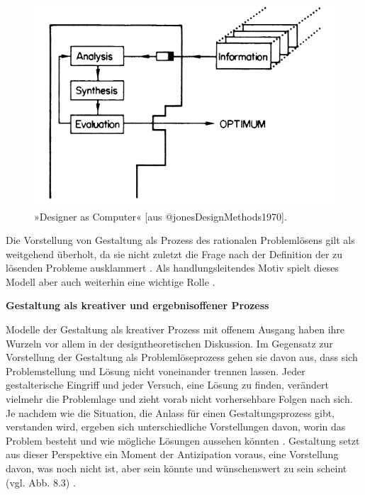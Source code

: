 \documentclass[
  a4paper,
]{book}
\begin{document}
\begin{figure}

{\centering \includegraphics[width=0.75\linewidth]{Figures/08-02-Designer-als-Computer} 

}

\caption{»Designer as Computer« [aus @jonesDesignMethods1970].}\label{fig:fig9}
\end{figure}

Die Vorstellung von Gestaltung als Prozess des rationalen Problemlösens gilt als weitgehend überholt, da sie nicht zuletzt die Frage nach der Definition der zu lösenden Probleme ausklammert \citep[z.B.][]{rittelPlanningCrisisSystems1972}. Als handlungsleitendes Motiv spielt dieses Modell aber auch weiterhin eine wichtige Rolle \citep{pahlKonstruktionslehreGrundlagenErfolgreicher2007}.

\textbf{Gestaltung als kreativer und ergebnisoffener Prozess}

Modelle der Gestaltung als kreativer Prozess mit offenem Ausgang haben ihre Wurzeln vor allem in der designtheoretischen Diskussion. Im Gegensatz zur Vorstellung der Gestaltung als Problemlöseprozess gehen sie davon aus, dass sich Problemstellung und Lösung nicht voneinander trennen lassen. Jeder gestalterische Eingriff und jeder Versuch, eine Lösung zu finden, verändert vielmehr die Problemlage und zieht vorab nicht vorhersehbare Folgen nach sich. Je nachdem wie die Situation, die Anlass für einen Gestaltungsprozess gibt, verstanden wird, ergeben sich unterschiedliche Vorstellungen davon, worin das Problem besteht und wie mögliche Lösungen aussehen könnten \citep[z. B.][]{rittelPlanningCrisisSystems1972}. Gestaltung setzt aus dieser Perspektive ein Moment der Antizipation voraus, eine Vorstellung davon, was noch nicht ist, aber sein könnte und wünschenswert zu sein scheint (vgl. {Abb. 8.3}) \citep[vgl.][]{krippendorffProductSemanticsTriangulation1989, zamenopoulosAnticipatoryViewDesign2007}.
\end{document}
